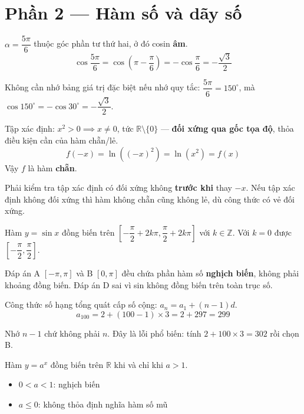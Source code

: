 \documentclass[11pt, a4paper]{article}
\begin{document}
\section{Phần 2 — Hàm số và dãy số}

\begin{dapan}[3 — Đáp án D]
$\alpha=\dfrac{5\pi}{6}$ thuộc góc phần tư thứ hai, ở đó cosin \textbf{âm}.
\[
\cos\frac{5\pi}{6}=\cos\left(\pi-\frac{\pi}{6}\right)=-\cos\frac{\pi}{6}=-\frac{\sqrt{3}}{2}
\]

 Không cần nhớ bảng giá trị đặc biệt nếu nhớ quy tắc: $\dfrac{5\pi}{6}=150^\circ$, mà $\cos 150^\circ=-\cos 30^\circ=-\dfrac{\sqrt{3}}{2}$.
\end{dapan}

\begin{dapan}[4 — Đáp án D]
Tập xác định: $x^2>0 \implies x \neq 0$, tức $\mathbb{R}\setminus\{0\}$ — \textbf{đối xứng qua gốc tọa độ}, thỏa điều kiện cần của hàm chẵn/lẻ.
\[
f(-x)=\ln\left((-x)^2\right)=\ln(x^2)=f(x)
\]
Vậy $f$ là hàm \textbf{chẵn}.

 Phải kiểm tra tập xác định có đối xứng không \textbf{trước khi} thay $-x$. Nếu tập xác định không đối xứng thì hàm không chẵn cũng không lẻ, dù công thức có vẻ đối xứng.
\end{dapan}

\begin{dapan}[5 — Đáp án C]
Hàm $y=\sin x$ đồng biến trên $\left[-\dfrac{\pi}{2}+2k\pi, \dfrac{\pi}{2}+2k\pi\right]$ với $k \in \mathbb{Z}$. Với $k=0$ được $\left[-\dfrac{\pi}{2},\dfrac{\pi}{2}\right]$.

 Đáp án A $[-\pi,\pi]$ và B $[0,\pi]$ đều chứa phần hàm số \textbf{nghịch biến}, không phải khoảng đồng biến. Đáp án D sai vì sin không đồng biến trên toàn trục số.
\end{dapan}

\begin{dapan}[6 — Đáp án D]
Công thức số hạng tổng quát cấp số cộng: $a_n=a_1+(n-1)d$.
\[
a_{100}=2+(100-1)\times 3=2+297=299
\]

 Nhớ $n-1$ chứ không phải $n$. Đây là lỗi phổ biến: tính $2+100\times3=302$ rồi chọn B.
\end{dapan}

\begin{dapan}[7 — Đáp án A]
Hàm $y=a^x$ đồng biến trên $\mathbb{R}$ khi và chỉ khi $a>1$.

\begin{itemize}[leftmargin=1.4em, itemsep=2pt]
\item $0<a<1$: nghịch biến
\item $a \le 0$: không thỏa định nghĩa hàm số mũ
\end{itemize}
\end{dapan}
\end{document}
